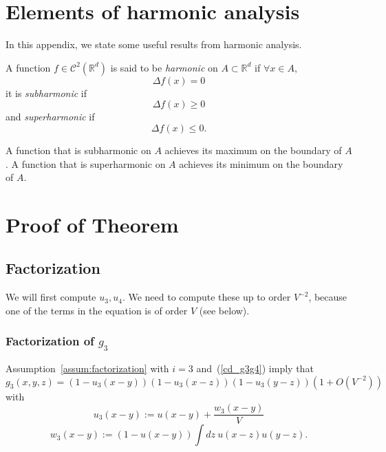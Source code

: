 \documentclass{ian}
\begin{document}
\section{Elements of harmonic analysis}\label{app:harmonic}
\indent
In this appendix, we state some useful results from harmonic analysis.
\bigskip

  A function $f\in \mathcal C^2(\mathbb R^d)$ is said to be {\it harmonic} on $A\subset\mathbb R^d$ if $\forall x\in A$,
  \begin{equation}
    \Delta f(x)=0
  \end{equation}
  it is {\it subharmonic} if
  \begin{equation}
    \Delta f(x)\geqslant 0
  \end{equation}
  and {\it superharmonic} if
  \nopagebreakaftereq
  \begin{equation}
    \Delta f(x)\leqslant 0
    .
  \end{equation}
\endtheo
\restorepagebreakaftereq
\bigskip

\label{theo:harmonic}
  A function that is subharmonic on $A$ achieves its maximum on the boundary of $A$.
  A function that is superharmonic on $A$ achieves its minimum on the boundary of $A$.
\endtheo

\section{Proof of Theorem \expandonce{\ref{theo:compleq}}}\label{app:proof_factorization}

\subsection{Factorization}
\indent
We will first compute $u_3,u_4$.
We need to compute these up to order $V^{-2}$, because one of the terms in the equation is of order $V$ (see below).
\bigskip

\subsubsection{Factorization of $g_3$}
\label{lemma:g3}
  Assumption\-~\ref{assum:factorization} with $i=3$ and\-~(\ref{cd_g3g4}) imply that
  \begin{equation}
    g_3(x,y,z)=(1-u_3(x-y))(1-u_3(x-z))(1-u_3(y-z))(1+O(V^{-2}))
  \end{equation}
  with
  \begin{equation}
    u_3(x-y):=u(x-y)+\frac{w_3(x-y)}V
    \label{u3}
  \end{equation}
  \nopagebreakaftereq
  \begin{equation}
    w_3(x-y):=(1-u(x-y))\int dz\ u(x-z)u(y-z)
    .
    \label{w3}
  \end{equation}
\endtheo
\restorepagebreakaftereq
\bigskip
\end{document}
